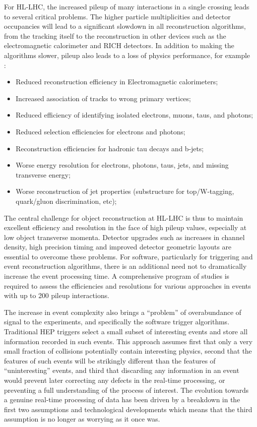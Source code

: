 For HL-LHC, the increased pileup of many interactions in a single crossing leads to several critical problems. The higher particle multiplicities and detector occupancies will lead 
to a significant slowdown in all reconstruction algorithms, from the tracking itself to the reconstruction in other devices such as the electromagnetic calorimeter and RICH detectors. 
In addition to making the algorithms slower, pileup also leads to a loss of physics performance, for example :
\begin{itemize}
\item Reduced reconstruction efficiency in Electromagnetic calorimeters;
\item Increased association of tracks to wrong primary vertices;
\item Reduced efficiency of identifying isolated electrons, muons, taus, and photons;
\item Reduced selection efficiencies for electrons and photons;
\item Reconstruction efficiencies for hadronic tau decays and b-jets;
\item Worse energy resolution for electrons, photons, taus, jets, and missing transverse energy;
\item Worse reconstruction of jet properties (substructure for top/W-tagging, quark/gluon discrimination, etc);
\end{itemize}

The central challenge for object reconstruction at HL-LHC is thus to maintain excellent efficiency and resolution in the face of high pileup values, especially at low object transverse momenta. 
Detector upgrades such as increases in channel density, high precision timing and improved detector geometric layouts are essential to overcome these problems. For software, particularly for 
triggering and event reconstruction algorithms, there is an additional need not to dramatically increase the event processing time. A comprehensive program of studies is required to assess the 
efficiencies and resolutions for various approaches in events with up to 200 pileup interactions. 

The increase in event complexity also brings a ``problem'' of overabundance of signal to the experiments, and specifically the software trigger algorithms. Traditional HEP triggers select a small 
subset of interesting events and store all information recorded in such events. This approach assumes first that only a very small fraction of collisions potentially contain interesting physics, 
second that the features of such events will be strikingly different than the features of ``uninteresting'' events, and third that discarding any information in an event would prevent later correcting 
any defects in the real-time processing, or preventing a full understanding of the process of interest. The evolution towards a genuine real-time processing of data has been driven by a breakdown 
in the first two assumptions and technological developments which means that the third assumption is no longer as worrying as it once was.

